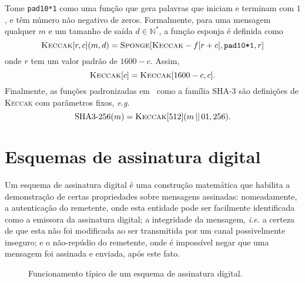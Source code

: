 \documentclass{ufsctex/ufsctex}
\newcommand{\pk}{\mathcal{P}_{k}}
\newcommand{\sk}{\mathcal{S}_{k}}
\newcommand{\concat}{\, \vert{} \vert{} \,}
\newcommand{\binwds}[1]{\{0, 1\}^{#1}}
\begin{document}
Tome \texttt{pad10*1} como uma função que gera palavras que iniciam e terminam
com $1$, e têm número não negativo de zeros. Formalmente, para uma mensagem
qualquer $m$ e um tamanho de saída $d \in \mathbb{N}^{*}$, a função esponja é
definida como
\begin{equation}
  \textsc{Keccak}[r, c](m, d)
    = \textsc{Sponge}[\textsc{Keccak}-f[r + c], \texttt{pad10*1}, r]
\end{equation}
onde $r$ tem um valor padrão de $1600 - c$. Assim,
\begin{equation}
  \textsc{Keccak}[c] = \textsc{Keccak}[1600 - c, c].
\end{equation}
Finalmente, as funções padronizadas em~\cite{Dworkin:report:2015:jul} como a
família SHA-3 são definições de \textsc{Keccak} com parâmetros fixos,
\emph{e.g.}
\begin{equation}
  \text{SHA3-}256(m) = \textsc{Keccak}[512](m \concat 01, 256).
\end{equation}\simbolo{$\concat$}{Concatenação de palavras}

\section{Esquemas de assinatura digital}\label{section:digitalsig}

Um esquema de assinatura digital é uma construção matemática que habilita a
demonstração de certas propriedades sobre mensagens assinadas: nomeadamente, a
autenticação do remetente, onde esta entidade pode ser facilmente identificada
como a emissora da assinatura digital; a integridade da mensagem, \emph{i.e.} a
certeza de que esta não foi modificada ao ser transmitida por um canal
possivelmente inseguro; e o não-repúdio do remetente, onde é impossível negar
que uma mensagem foi assinada e enviada, após este fato.

\begin{figure}
  \centering
  \caption{Funcionamento típico de um
    esquema de assinatura digital.}\label{fig:2}
\end{figure}
\end{document}

